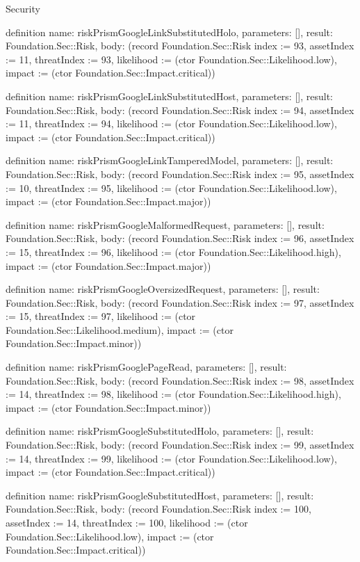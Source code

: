 \begin{lexlean}{Security}
\begin{semanticmodule}
definition{
  name: riskPrismGoogleLinkSubstitutedHolo,
  parameters: [],
  result: Foundation.Sec::Risk,
  body: (record Foundation.Sec::Risk {index := 93, assetIndex := 11, threatIndex := 93, likelihood := (ctor Foundation.Sec::Likelihood.low), impact := (ctor Foundation.Sec::Impact.critical)})
}

definition{
  name: riskPrismGoogleLinkSubstitutedHost,
  parameters: [],
  result: Foundation.Sec::Risk,
  body: (record Foundation.Sec::Risk {index := 94, assetIndex := 11, threatIndex := 94, likelihood := (ctor Foundation.Sec::Likelihood.low), impact := (ctor Foundation.Sec::Impact.critical)})
}

definition{
  name: riskPrismGoogleLinkTamperedModel,
  parameters: [],
  result: Foundation.Sec::Risk,
  body: (record Foundation.Sec::Risk {index := 95, assetIndex := 10, threatIndex := 95, likelihood := (ctor Foundation.Sec::Likelihood.low), impact := (ctor Foundation.Sec::Impact.major)})
}

definition{
  name: riskPrismGoogleMalformedRequest,
  parameters: [],
  result: Foundation.Sec::Risk,
  body: (record Foundation.Sec::Risk {index := 96, assetIndex := 15, threatIndex := 96, likelihood := (ctor Foundation.Sec::Likelihood.high), impact := (ctor Foundation.Sec::Impact.major)})
}

definition{
  name: riskPrismGoogleOversizedRequest,
  parameters: [],
  result: Foundation.Sec::Risk,
  body: (record Foundation.Sec::Risk {index := 97, assetIndex := 15, threatIndex := 97, likelihood := (ctor Foundation.Sec::Likelihood.medium), impact := (ctor Foundation.Sec::Impact.minor)})
}

definition{
  name: riskPrismGooglePageRead,
  parameters: [],
  result: Foundation.Sec::Risk,
  body: (record Foundation.Sec::Risk {index := 98, assetIndex := 14, threatIndex := 98, likelihood := (ctor Foundation.Sec::Likelihood.high), impact := (ctor Foundation.Sec::Impact.minor)})
}

definition{
  name: riskPrismGoogleSubstitutedHolo,
  parameters: [],
  result: Foundation.Sec::Risk,
  body: (record Foundation.Sec::Risk {index := 99, assetIndex := 14, threatIndex := 99, likelihood := (ctor Foundation.Sec::Likelihood.low), impact := (ctor Foundation.Sec::Impact.critical)})
}

definition{
  name: riskPrismGoogleSubstitutedHost,
  parameters: [],
  result: Foundation.Sec::Risk,
  body: (record Foundation.Sec::Risk {index := 100, assetIndex := 14, threatIndex := 100, likelihood := (ctor Foundation.Sec::Likelihood.low), impact := (ctor Foundation.Sec::Impact.critical)})
}


\end{semanticmodule}
\end{lexlean}
